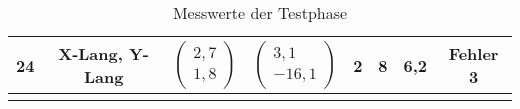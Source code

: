 \begin{appendix}
\begin{center}
\begin{longtable}{|c|c|c|c|c|c|c|c|}
    		\hline
    		24 & X-Lang, Y-Lang &  $\left(\begin{array}{c} 2,7 \\ 1,8\end{array}\right)$ & $\left(\begin{array}{c} 3,1 \\ -16,1\end{array}\right)$ & 2& 8& 6,2& Fehler 3\\
    		\hline
    		\caption{Messwerte der Testphase}
    		\label{tab:messw}
    	\end{longtable}
    \end{center}
    
\end{appendix}


